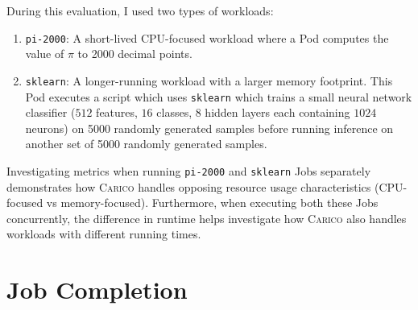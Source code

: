 During this evaluation, I used two types of workloads:
\begin{enumerate}
    \item \texttt{pi-2000}: A short-lived CPU-focused workload where a Pod
        computes the value of $\pi$ to 2000 decimal points.
    \item \texttt{sklearn}: A longer-running workload with a larger memory
        footprint. This Pod executes a script which uses
        \texttt{sklearn} which trains a small neural network classifier ($512$
        features, $16$ classes, $8$ hidden layers each containing $1024$
        neurons) on 5000 randomly generated samples before running inference on
        another set of 5000 randomly generated samples.
\end{enumerate}
Investigating metrics when running \texttt{pi-2000} and \texttt{sklearn} Jobs
separately demonstrates how \textsc{Carico} handles opposing resource usage
characteristics (CPU-focused vs memory-focused). Furthermore, when executing
both these Jobs concurrently, the difference in runtime helps investigate how
\textsc{Carico} also handles workloads with different running times.

%

\section{Job Completion}
\label{sec:eval-job-completion}

